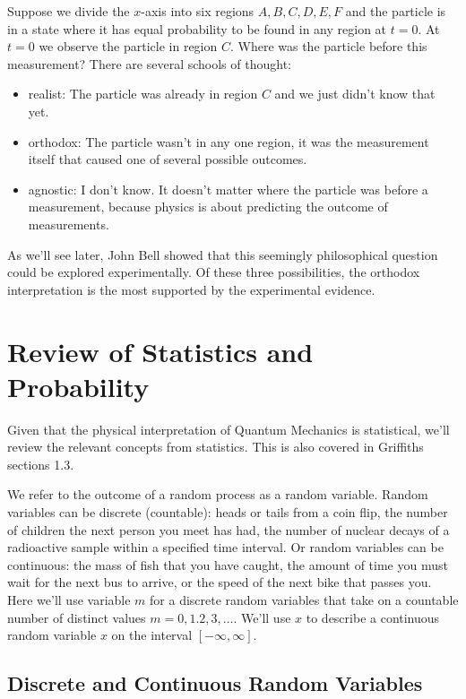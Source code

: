 \documentclass[12pt]{book}
\begin{document}
Suppose we divide the $x$-axis into six regions $A,B,C,D,E,F$ and the particle is in a state where it has equal probability to be found in any region at $t=0$.  At $t=0$ we observe the particle in region $C$.  Where was the particle before this measurement?  There are several schools of thought:
\begin{itemize}
\item realist:  The particle was already in region $C$ and we just didn't know that yet.
\item orthodox:  The particle wasn't in any one region, it was the measurement itself that caused one of several possible outcomes.
\item agnostic:  I don't know.  It doesn't matter where the particle was before a measurement, because physics is about predicting the outcome of measurements.
\end{itemize}
As we'll see later, John Bell showed that this seemingly philosophical question could be explored experimentally.  Of these three possibilities, the orthodox interpretation is the most supported by the experimental evidence.

\section{Review of Statistics and Probability}

Given that the physical interpretation of Quantum Mechanics is statistical, we'll review the relevant concepts from statistics. This is also covered in Griffiths sections 1.3.  

We refer to the outcome of a random process as a random variable.  Random variables can be discrete (countable): heads or tails from a coin flip, the number of children the next person you meet has had, the number of nuclear decays of a radioactive sample within a specified time interval.  Or random variables can be continuous:  the mass of fish that you have caught, the amount of time you must wait for the next bus to arrive, or the speed of the next bike that passes you.  Here we'll use variable $m$ for a discrete random variables that take on a countable number of distinct values $m=0,1.2,3,\ldots$.  We'll use $x$ to describe a continuous random variable $x$ on the interval $[-\infty, \infty]$. 

\subsection{Discrete and Continuous Random Variables}
\end{document}
